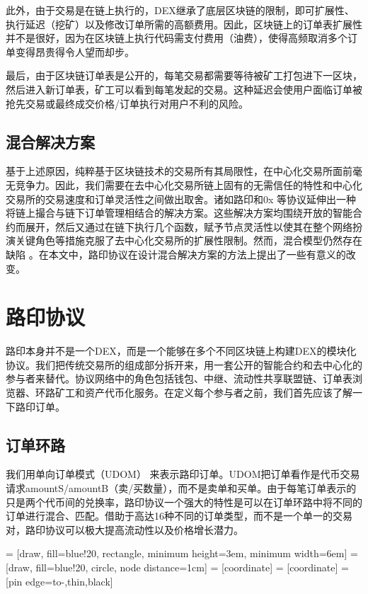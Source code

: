 \documentclass[UTF8]{ctexart}
\makeatletter
\newenvironment{figurehere}
 {\def\@captype{figure}}
 {}
\makeatother
\begin{document}
\begin{multicols}{2}
此外，由于交易是在链上执行的，DEX继承了底层区块链的限制，即可扩展性、执行延迟（挖矿）以及修改订单所需的高额费用。因此，区块链上的订单表扩展性并不是很好，因为在区块链上执行代码需支付费用（油费），使得高频取消多个订单变得昂贵得令人望而却步。

最后，由于区块链订单表是公开的，每笔交易都需要等待被矿工打包进下一区块，然后进入新订单表，矿工可以看到每笔发起的交易。这种延迟会使用户面临订单被抢先交易或最终成交价格/订单执行对用户不利的风险。

\subsection{混合解决方案}
基于上述原因，纯粹基于区块链技术的交易所有其局限性，在中心化交易所面前毫无竞争力。因此，我们需要在去中心化交易所链上固有的无需信任的特性和中心化交易所的交易速度和订单灵活性之间做出取舍。诸如路印和0x \cite{warren20170x} 等协议延伸出一种将链上撮合与链下订单管理相结合的解决方案。这些解决方案均围绕开放的智能合约而展开，然后又通过在链下执行几个函数，赋予节点灵活性以使其在整个网络扮演关键角色等措施克服了去中心化交易所的扩展性限制。然而，混合模型仍然存在缺陷 \cite{costofdecent}。在本文中，路印协议在设计混合解决方案的方法上提出了一些有意义的改变。


\section{路印协议\label{sec:loopring_protocol}}
路印本身并不是一个DEX，而是一个能够在多个不同区块链上构建DEX的模块化协议。我们把传统交易所的组成部分拆开来，用一套公开的智能合约和去中心化的参与者来替代。协议网络中的角色包括钱包、中继、流动性共享联盟链、订单表浏览器、环路矿工和资产代币化服务。在定义每个参与者之前，我们首先应该了解一下路印订单。 

\subsection{订单环路\label{sec:order_ring}}
我们用单向订单模式（UDOM）\cite{coinport2014udom} 来表示路印订单。UDOM把订单看作是代币交易请求amountS/amountB（卖/买数量），而不是卖单和买单。由于每笔订单表示的只是两个代币间的兑换率，路印协议一个强大的特性是可以在订单环路中将不同的订单进行混合、匹配。借助于高达16种不同的订单类型，而不是一个单一的交易对，路印协议可以极大提高流动性以及价格增长潜力。 

\begin{center}
\begin{figurehere}
\centering
{} = [draw, fill=blue!20, rectangle, 
    minimum height=3em, minimum width=6em]
 = [draw, fill=blue!20, circle, node distance=1cm]
 = [coordinate]
 = [coordinate]
 = [pin edge={to-,thin,black}]


\end{figurehere}
\end{center}
\end{multicols}
\end{document}
